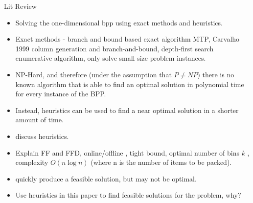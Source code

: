 \documentclass[oribibl]{llncs}
\begin{document}
Lit Review
\begin{itemize}
	\item Solving the one-dimensional bpp using exact methods and heuristics.
	\item Exact methods - \cite{martello1990a} branch and bound based exact algorithm MTP, Carvalho 1999 column generation and branch-and-bound, \cite{eilon1971} depth-first search enumerative algorithm, only solve small size problem instances.
	\item \cite{garey1979} NP-Hard, and therefore (under the assumption that $P \neq NP$) there is no known algorithm that is able to find an optimal solution in polynomial time for every instance of the BPP.
	\item Instead, heuristics can be used to find a near optimal solution in a shorter amount of time.
	\item discuss heuristics.
	\item Explain FF and FFD, online/offline \cite{eilon1971}, \cite{dosa2007} tight bound, optimal number of bins $k$ \cite{korf2002}, complexity $O(n \log n)$ \cite{coffman1984} (where n is the number of items to be packed).
	\item quickly produce a feasible solution, but may not be optimal.
	\item Use heuristics in this paper to find feasible solutions for the problem, why?
\end{itemize}
\end{document}
